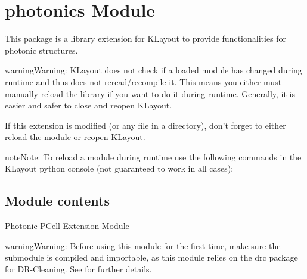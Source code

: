 \documentclass[a4paper,10pt,english]{sphinxmanual}
\begin{document}
\section{photonics Module}
\label{\detokenize{photonics/photonics:photonics-module}}\label{\detokenize{photonics/photonics::doc}}
This package is a library extension for KLayout to provide functionalities for photonic structures.

\begin{sphinxadmonition}{warning}{Warning:}
KLayout does not check if a loaded module has changed during runtime and thus does not reread/recompile it.
This means you either must manually reload the library if you want to do it during runtime. Generally, it is easier and
safer to close and reopen KLayout.

If this extension is modified (or any file in a  directory), don’t forget to either reload the module or
reopen KLayout.

\begin{sphinxadmonition}{note}{Note:}
To reload a module during runtime use the following commands in the KLayout python console (not guaranteed to work in all cases):

\begin{sphinxVerbatim}[commandchars=\\\{\}]
   
 
\end{sphinxVerbatim}
\end{sphinxadmonition}
\end{sphinxadmonition}


\subsection{Module contents}
\label{\detokenize{photonics/photonics:module-kppc.photonics}}\label{\detokenize{photonics/photonics:module-contents}}
Photonic PCell-Extension Module

\begin{sphinxadmonition}{warning}{Warning:}
Before using this module for the first time, make sure the  submodule is compiled and importable, as this  module
relies on the drc package for DR-Cleaning. See  for further details.
\end{sphinxadmonition}
\end{document}
